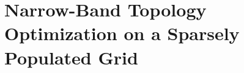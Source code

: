 \chapter{Narrow-Band Topology Optimization on a Sparsely Populated Grid} 
\label{Chapter:Elasticity}

